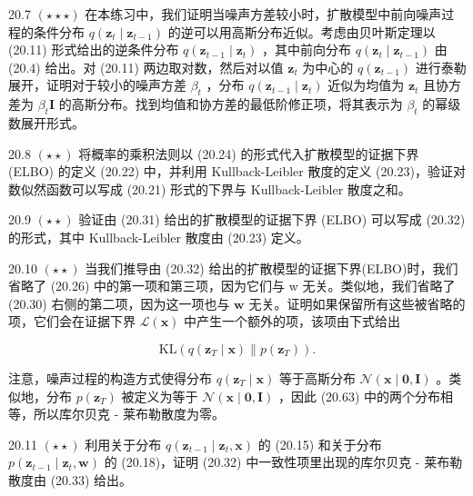 \documentclass[10pt]{article}
\begin{document}
20.7 \(\left( {\star  \star   \star  }\right)\) 在本练习中，我们证明当噪声方差较小时，扩散模型中前向噪声过程的条件分布 \(q\left( {{\mathbf{z}}_{t} \mid  {\mathbf{z}}_{t - 1}}\right)\) 的逆可以用高斯分布近似。考虑由贝叶斯定理以 (20.11) 形式给出的逆条件分布 \(q\left( {{\mathbf{z}}_{t - 1} \mid  {\mathbf{z}}_{t}}\right)\) ，其中前向分布 \(q\left( {{\mathbf{z}}_{t} \mid  {\mathbf{z}}_{t - 1}}\right)\) 由 (20.4) 给出。对 (20.11) 两边取对数，然后对以值 \({\mathbf{z}}_{t}\) 为中心的 \(q\left( {\mathbf{z}}_{t - 1}\right)\) 进行泰勒展开，证明对于较小的噪声方差 \({\beta }_{t}\) ，分布 \(q\left( {{\mathbf{z}}_{t - 1} \mid  {\mathbf{z}}_{t}}\right)\) 近似为均值为 \({\mathbf{z}}_{t}\) 且协方差为 \({\beta }_{t}\mathbf{I}\) 的高斯分布。找到均值和协方差的最低阶修正项，将其表示为 \({\beta }_{t}\) 的幂级数展开形式。

20.8 \(\left( {\star  \star  }\right)\) 将概率的乘积法则以 (20.24) 的形式代入扩散模型的证据下界 (ELBO) 的定义 (20.22) 中，并利用 Kullback-Leibler 散度的定义 (20.23)，验证对数似然函数可以写成 (20.21) 形式的下界与 Kullback-Leibler 散度之和。

20.9 \(\left( {\star  \star  }\right)\) 验证由 (20.31) 给出的扩散模型的证据下界 (ELBO) 可以写成 (20.32) 的形式，其中 Kullback-Leibler 散度由 (20.23) 定义。

20.10 \(\left( {\star  \star  }\right)\) 当我们推导由 (20.32) 给出的扩散模型的证据下界(ELBO)时，我们省略了 (20.26) 中的第一项和第三项，因为它们与 w 无关。类似地，我们省略了 (20.30) 右侧的第二项，因为这一项也与 \(\mathbf{w}\) 无关。证明如果保留所有这些被省略的项，它们会在证据下界 \(\mathcal{L}\left( \mathbf{x}\right)\) 中产生一个额外的项，该项由下式给出

\[
\mathrm{{KL}}\left( {q\left( {{\mathbf{z}}_{T} \mid  \mathbf{x}}\right) \parallel p\left( {\mathbf{z}}_{T}\right) }\right) . \tag{20.63}
\]

注意，噪声过程的构造方式使得分布 \(q\left( {{\mathbf{z}}_{T} \mid  \mathbf{x}}\right)\) 等于高斯分布 \(\mathcal{N}\left( {\mathbf{x} \mid  \mathbf{0},\mathbf{I}}\right)\) 。类似地，分布 \(p\left( {\mathbf{z}}_{T}\right)\) 被定义为等于 \(\mathcal{N}\left( {\mathbf{x} \mid  \mathbf{0},\mathbf{I}}\right)\) ，因此 (20.63) 中的两个分布相等，所以库尔贝克 - 莱布勒散度为零。

20.11 \(\left( {\star  \star  }\right)\) 利用关于分布 \(q\left( {{\mathbf{z}}_{t - 1} \mid  {\mathbf{z}}_{t},\mathbf{x}}\right)\) 的 (20.15) 和关于分布 \(p\left( {{\mathbf{z}}_{t - 1} \mid  {\mathbf{z}}_{t},\mathbf{w}}\right)\) 的 (20.18)，证明 (20.32) 中一致性项里出现的库尔贝克 - 莱布勒散度由 (20.33) 给出。
\end{document}
